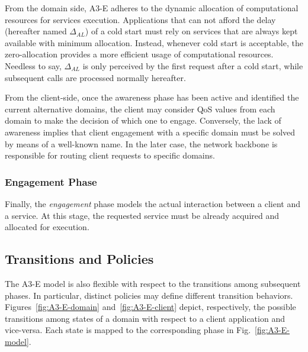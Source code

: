 From the domain side, A3-E adheres to the dynamic allocation of computational resources for services execution. Applications that can not afford the delay (hereafter named $\Delta_{AL}$) of a cold start must rely on services that are always kept available with minimum allocation. Instead, whenever cold start is acceptable, the zero-allocation provides a more efficient usage of computational resources. Needless to say, $\Delta_{AL}$ is only perceived by the first request after a cold start, while subsequent calls are processed normally hereafter.

From the client-side, once the awareness phase has been active and identified the current alternative domains, the client may consider QoS values from each domain to make the decision of which one to engage. Conversely, the lack of awareness implies that client engagement with a specific domain must be solved by means of a well-known name. In the later case, the network backbone is responsible for routing client requests to specific domains.

\subsubsection{Engagement Phase}\label{sec:A3-E-engagement}

Finally, the \textit{engagement} phase models the actual interaction between a client and a service. At this stage, the requested service must be already acquired and allocated for execution. 

\subsection{Transitions and Policies}

The A3-E model is also flexible with respect to the transitions among subsequent phases. In particular, distinct policies may define different transition behaviors. Figures~\ref{fig:A3-E-domain} and~\ref{fig:A3-E-client} depict, respectively, the possible transitions among states of a domain with respect to a client application and vice-versa. Each state is mapped to the corresponding phase in Fig.~\ref{fig:A3-E-model}.

